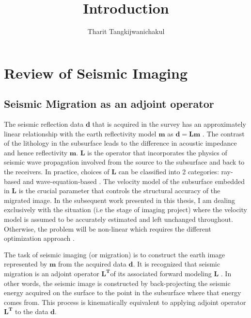 \title{Introduction}
\author{Tharit Tangkijwanichakul}
\label{ch:chapter-intro}
\maketitle
{}


\section{Review of Seismic Imaging}

\subsection{Seismic Migration as an adjoint operator}

The seismic reflection data $\mathbf{d}$ that is acquired in the survey has an approximately linear relationship with the earth reflectivity model $\mathbf{m}$ as $\mathbf{d=Lm}$ \cite[]{tarantola1984linearized, wiggins1972general}. The contrast of the lithology in the subsurface leads to the difference in acoustic impedance and hence reflectivity $\mathbf{m}$. $\mathbf{L}$ is the operator that incorporates the physics of seismic wave propagation involved from the source to the subsurface and back to the receivers. In practice, choices of $\mathbf{L}$ can be classified into 2 categories: ray-based and wave-equation-based \cite[]{jones2014tutorial}. The velocity model of the subsurface embedded in $\mathbf{L}$ is the crucial parameter that controls the structural accuracy of the migrated image. In the subsequent work presented in this thesis, I am dealing exclusively with the situation (i.e the stage of imaging project) where the velocity model is assumed to be accurately estimated and left unchanged throughout. Otherwise, the problem will be non-linear which requires the different optimization approach \cite[]{pica1990nonlinear}.

The task of seismic imaging (or migration) is to construct the earth image represented by $\mathbf{m}$ from the acquired data $\mathbf{d}$. It is recognized that seismic migration is an adjoint operator $\mathbf{L^T}$of its associated forward modeling $\mathbf{L}$ \cite[]{claerbout1992earth}. In other words, the seismic image is constructed by back-projecting the seismic energy acquired on the surface to the point in the subsurface where that energy comes from. This process is kinematically equivalent to applying adjoint operator $\mathbf{L^T}$ to the data $\mathbf{d}$.


